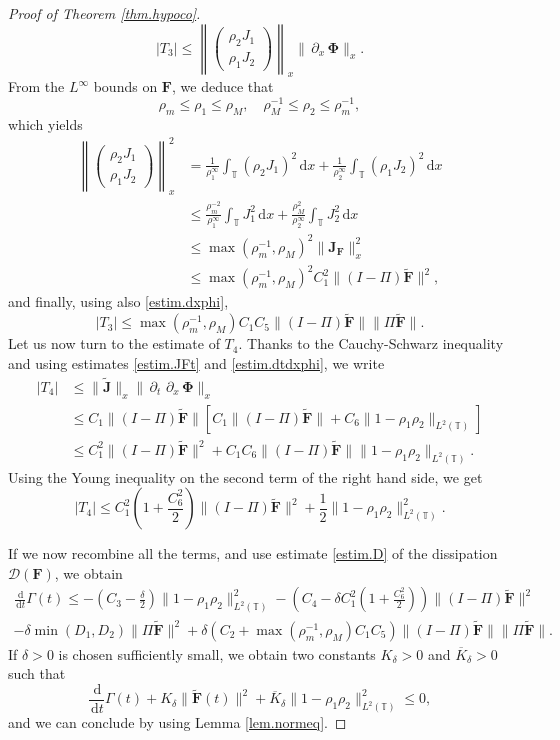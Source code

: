 \documentclass[reqno]{amsart}
\newcommand{\dt}{\,\partial_t\, }
\newcommand{\dx}{\,\partial_x\, }
\newcommand{\dd}{\,\mathrm{d}}
\newcommand{\T}{\mathbb{T}}
\newcommand{\Ft}{{\widetilde{F}}}
\newcommand{\Jt}{\widetilde{J}}
\newcommand{\Ftbf}{\mathbf{\Ft}}
\newcommand{\Fbf}{\mathbf{F}}
\newcommand{\Jbf}{\mathbf{J}}
\newcommand{\Phibf}{\boldsymbol{\Phi}}
\newcommand{\Jtbf}{\mathbf{\Jt}}
\numberwithin{equation}{section}
\begin{document}
\begin{proof}[Proof of Theorem \ref{thm.hypoco}]
    \[|T_3|\leq \left\|\left(\begin{matrix}\rho_2 J_1\\ \rho_1 J_2\end{matrix}\right)\right\|_x\|\dx\Phibf\|_x.\]
    From the $L^\infty$ bounds on $\Fbf$, we deduce that
    \[ \rho_m\leq \rho_1\leq \rho_M,\quad \rho_M^{-1}\leq \rho_2\leq \rho_m^{-1},\]
    which yields
    \begin{align*}
        \left\|\left(\begin{matrix}\rho_2 J_1\\ \rho_1 J_2\end{matrix}\right)\right\|_x^2&=\frac{1}{\rho_1^\infty}\int_\T(\rho_2 J_1)^2\dd x+\frac{1}{\rho_2^\infty}\int_\T (\rho_1 J_2)^2\dd x\\
        &\leq \frac{\rho_m^{-2}}{\rho_1^\infty}\int_\T J_1^2\dd x+\frac{\rho_M^2}{\rho_2^\infty}\int_\T J_2^2\dd x\\
        &\leq \max(\rho_m^{-1},\rho_M)^2\|\Jbf_\Fbf\|^2_x\\
        & \leq \max(\rho_m^{-1},\rho_M)^2C_1^2\|(I-\Pi)\Ftbf\|^2,
    \end{align*}
    and finally, using also \eqref{estim.dxphi},
    \begin{equation*}
        |T_3|\leq \max(\rho_m^{-1},\rho_M)C_1C_5\|(I-\Pi)\Ftbf\|\|\Pi\Ftbf\|.
    \end{equation*}
    Let us now turn to the estimate of $T_4$. Thanks to the Cauchy-Schwarz inequality and using estimates \eqref{estim.JFt} and \eqref{estim.dtdxphi}, we write
    \begin{align*}
        |T_4|&\leq \|\Jtbf\|_x\|\dt\dx\Phibf\|_x\\
        &\leq C_1\|(I-\Pi)\Ftbf\|\left[C_1\|(I-\Pi)\Ftbf\|+C_6\|1-\rho_1\rho_2\|_{L^2(\T)}\right]\\
        &\leq C_1^2\|(I-\Pi)\Ftbf\|^2+C_1C_6\|(I-\Pi)\Ftbf\|\|1-\rho_1\rho_2\|_{L^2(\T)}.
    \end{align*}
    Using the Young inequality on the second term of the right hand side, we get
    \[|T_4|\leq C_1^2\left(1+\frac{C_6^2}{2}\right)\|(I-\Pi)\Ftbf\|^2+\frac{1}{2}\|1-\rho_1\rho_2\|_{L^2(\T)}^2.\]

    If we now recombine all the terms, and use estimate \eqref{estim.D} of the dissipation $\mathcal{D}(\Fbf)$, we obtain
    \begin{gather*}
        \frac{\dd}{\dd t}\Gamma(t)\leq -\left(C_3-\frac{\delta}{2}\right)\|1-\rho_1\rho_2\|_{L^2(\T)}^2-\left(C_4-\delta C_1^2\left(1+\frac{C_6^2}{2}\right)\right)\|(I-\Pi)\Ftbf\|^2\\
        -\delta\min(D_1,D_2)\|\Pi\Ftbf\|^2+\delta\left(C_2+\max(\rho_m^{-1},\rho_M)C_1C_5\right)\|(I-\Pi)\Ftbf\|\|\Pi\Ftbf\|.
    \end{gather*}
  If $\delta>0$ is chosen sufficiently small, we obtain two constants $K_\delta>0$ and $\overline{K}_\delta>0$ such that
    \[\frac{\dd}{\dd t}\Gamma(t)+K_\delta\|\Ftbf(t)\|^2+\overline{K}_\delta \|1-\rho_1\rho_2\|^2_{L^2(\T)}\leq 0,\]
    and we can conclude by using Lemma \ref{lem.normeq}.
\end{proof}
\end{document}
